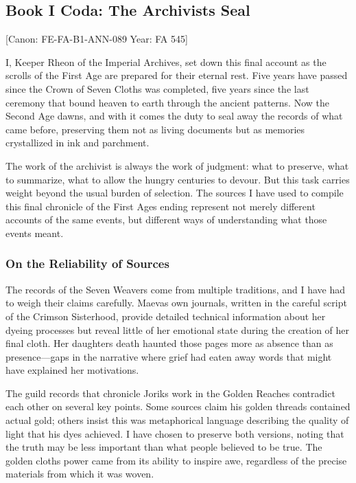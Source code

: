 \subsection{Book I Coda: The Archivist\textquotesingle s
Seal}\label{book-i-coda-the-archivists-seal}

{[}Canon: FE-FA-B1-ANN-089 \textbar{} Year: FA 545{]}

I, Keeper Rheon of the Imperial Archives, set down this final account as
the scrolls of the First Age are prepared for their eternal rest. Five
years have passed since the Crown of Seven Cloths was completed, five
years since the last ceremony that bound heaven to earth through the
ancient patterns. Now the Second Age dawns, and with it comes the duty
to seal away the records of what came before, preserving them not as
living documents but as memories crystallized in ink and parchment.

The work of the archivist is always the work of judgment: what to
preserve, what to summarize, what to allow the hungry centuries to
devour. But this task carries weight beyond the usual burden of
selection. The sources I have used to compile this final chronicle of
the First Age\textquotesingle s ending represent not merely different
accounts of the same events, but different ways of understanding what
those events meant.

\subsubsection{On the Reliability of
Sources}\label{on-the-reliability-of-sources}

The records of the Seven Weavers come from multiple traditions, and I
have had to weigh their claims carefully. Maeva\textquotesingle s own
journals, written in the careful script of the Crimson Sisterhood,
provide detailed technical information about her dyeing processes but
reveal little of her emotional state during the creation of her final
cloth. Her daughter\textquotesingle s death haunted those pages more as
absence than as presence---gaps in the narrative where grief had eaten
away words that might have explained her motivations.

The guild records that chronicle Jorik\textquotesingle s work in the
Golden Reaches contradict each other on several key points. Some sources
claim his golden threads contained actual gold; others insist this was
metaphorical language describing the quality of light that his dyes
achieved. I have chosen to preserve both versions, noting that the truth
may be less important than what people believed to be true. The golden
cloth\textquotesingle s power came from its ability to inspire awe,
regardless of the precise materials from which it was woven.

